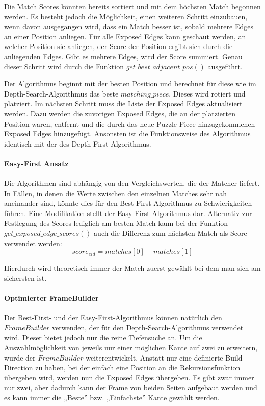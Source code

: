 Die Match Scores könnten bereits sortiert und mit dem höchsten Match begonnen werden. Es besteht jedoch die Möglichkeit, einen weiteren Schritt einzubauen, wenn davon ausgegangen wird, dass ein Match besser ist, sobald mehrere Edges an einer Position anliegen.
Für alle Exposed Edges kann geschaut werden, an welcher Position sie anliegen, der Score der Position ergibt sich durch die anliegenden Edges. Gibt es mehrere Edges, wird der Score summiert. 
Genau dieser Schritt wird durch die Funktion $get\_best\_adjacent\_pos()$ ausgeführt. 

Der Algorithmus beginnt mit der besten Position und berechnet für diese wie im Depth-Search-Algorithmus das beste $matching\_piece$. Dieses wird rotiert und platziert. Im nächsten Schritt muss die Liste der Exposed Edges aktualisiert werden. Dazu werden die zuvorigen Exposed Edges, die an der platzierten Position waren, entfernt und die durch das neue Puzzle Piece hinzugekommenen Exposed Edges hinzugefügt. 
Ansonsten ist die Funktionsweise des Algorithmus identisch mit der des Depth-First-Algorithmus.

\paragraph{Easy-First Ansatz}
Die Algorithmen sind abhängig von den Vergleichswerten, die der Matcher liefert. In Fällen, in denen die Werte zwischen den einzelnen Matches sehr nah aneinander sind, könnte dies für den Best-First-Algorithmus zu Schwierigkeiten führen.
Eine Modifikation stellt der Easy-First-Algorithmus dar. Alternativ zur Festlegung des Scores lediglich am besten Match kann bei der Funktion $get\_exposed\_edge\_scores()$ auch die Differenz zum nächsten Match als Score verwendet werden:
$$
    score_{eid} = matches[0] - matches[1]
$$

Hierdurch wird theoretisch immer der Match zuerst gewählt bei dem man sich am sichersten ist.

\paragraph{Optimierter FrameBuilder}
Der Best-First- und der Easy-First-Algorithmus können natürlich den $FrameBuilder$ verwenden, der für den Depth-Search-Algorithmus verwendet wird. Dieser bietet jedoch nur die reine Tiefensuche an. Um die Auswahlmöglichkeit von jeweils nur einer möglichen Kante auf zwei zu erweitern, wurde der $FrameBuilder$ weiterentwickelt. 
Anstatt nur eine definierte Build Direction zu haben, bei der einfach eine Position an die Rekursionsfunktion übergeben wird, werden nun die Exposed Edges übergeben. Es gibt zwar immer nur zwei, aber dadurch kann der Frame von beiden Seiten aufgebaut werden und es kann immer die „Beste” bzw. „Einfachste” Kante gewählt werden.

